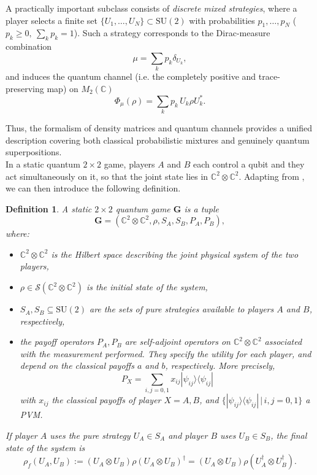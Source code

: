 \documentclass[11pt,a4paper,twoside]{article}
\newcommand{\SU}{\mathrm{SU}}
\newtheorem{definition}{Definition}
\begin{document}
A practically important subclass consists of \emph{discrete mixed strategies}, where a player selects a finite set \(\{U_1,\dots,U_N\}\subset\SU(2)\) with probabilities \(p_1,\dots,p_N\) (\(p_k\ge0,\ \sum_k p_k=1\)).
Such a strategy corresponds to the Dirac-measure combination $$\mu = \sum_k p_k\delta_{U_k},$$
and induces the quantum channel (i.e. the completely positive and trace-preserving map) on $M_2(\mathbb{C})$
$$\Phi_\mu(\rho)=\sum_k p_k\,U_k\rho U_k^*.$$

Thus, the formalism of density matrices and quantum channels provides a unified description covering both classical probabilistic mixtures and genuinely quantum superpositions.
\smallskip\\

In a static quantum $2\times 2$ game, players $A$ and $B$ each control a qubit and they act simultaneously on it, so that the joint state lies in $\mathbb{C}^2\otimes\mathbb{C}^2$. Adapting from \cite{eisert_2009}, we can then introduce the following definition.

\begin{definition}
A \emph{static $2\times 2$ quantum game} $\mathbf{G}$ is a tuple
\[
\mathbf{G}= (\mathbb{C}^2\otimes\mathbb{C}^2, \rho, S_A, S_B, P_A, P_B),
\]
where:
\begin{itemize}
\item[-] $\mathbb{C}^2\otimes\mathbb{C}^2$ is the Hilbert space describing the joint physical system of the two players,
\item[-] $\rho \in \mathcal{S}(\mathbb{C}^2\otimes\mathbb{C}^2)$ is the initial state of the system,
\item[-] $S_A, S_B \subseteq \mathrm{SU}(2)$ are the sets of pure strategies available to players $A$ and $B$, respectively,
\item[-] the \emph{payoff operators} $P_A, P_B$ are self-adjoint operators on $\mathbb{C}^2\otimes\mathbb{C}^2$ associated with the measurement performed. They specify the utility for each player, and depend on the classical payoffs $a$ and $b$, respectively. More precisely,
\begin{equation}\label{def-PX} P_X=\sum_{i,j=0,1}x_{ij}|\psi_{ij}\rangle\langle\psi_{ij}|
\end{equation}
with \(x_{ij}\) the classical payoffs of player $X=A,B$, and $\{|\psi_{ij}\rangle\langle\psi_{ij}|\,|\,i,j=0,1\}$ a PVM.
\end{itemize}

If player \(A\) uses the pure strategy \(U_A\in S_A\) and player \(B\) uses \(U_B\in S_B\), the final state of the system is
$$\rho_f(U_A,U_B):=(U_A\otimes U_B)\rho(U_A\otimes U_B)^\dagger=(U_A\otimes U_B)\rho(U_A^\dagger\otimes U_B^\dagger).$$

\end{definition}
\smallskip
\end{document}
